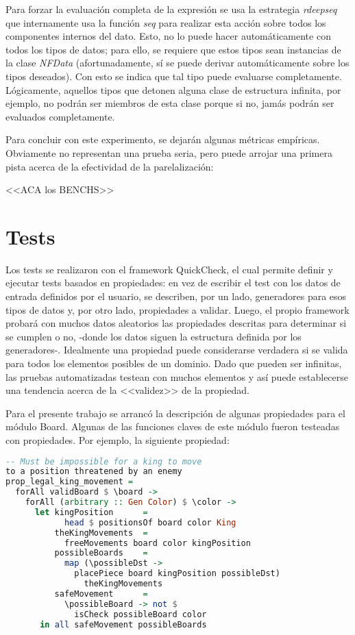 \documentclass{llncs}
\begin{document}
Para forzar la evaluación completa de la expresión se usa la estrategia \textit{rdeepseq} que internamente usa la función \textit{seq} para realizar esta acción sobre todos los componentes internos del dato. Esto, no lo puede hacer automáticamente con todos los tipos de datos; para ello, se requiere que estos tipos sean instancias de la clase \textit{NFData} (afortunadamente, sí se puede derivar automáticamente sobre los tipos deseados). Con esto se indica que tal tipo puede evaluarse completamente. Lógicamente, aquellos tipos que detonen alguna clase de estructura infinita, por ejemplo, no podrán ser miembros de esta clase porque si no, jamás podrán ser evaluados completamente.

Para concluir con este experimento, se dejarán algunas métricas empíricas. Obviamente no representan una prueba seria, pero puede arrojar una primera pista acerca de la efectividad de la parelalización:

<<ACA los BENCHS>>

\section{Tests}

Los tests se realizaron con el framework QuickCheck, el cual permite definir y ejecutar tests basados en propiedades: en vez de escribir el test con los datos de entrada definidos por el usuario, se describen, por un lado, generadores para esos tipos de datos y, por otro lado, propiedades a validar. Luego, el propio framework probará con muchos datos aleatorios las propiedades descritas para determinar si se cumplen o no, -donde los datos siguen la estructura definida por los generadores-. Idealmente una propiedad puede considerarse verdadera si se valida para todos los elementos posibles de un dominio. Dado que pueden ser infinitas, las pruebas automatizadas testean con muchos elementos y así puede establecerse una tendencia acerca de la <<validez>> de la propiedad.

Para el presente trabajo se arrancó la descripción de algunas propiedades para el módulo Board. Algunas de las funciones claves de este módulo fueron testeadas con propiedades. Por ejemplo, la siguiente propiedad:

\begin{lstlisting}[frame=single, language=haskell, captionpos=b, caption=Propiedad sobre los movimientos legales del rey]
-- Must be impossible for a king to move
to a position threatened by an enemy
prop_legal_king_movement =
  forAll validBoard $ \board ->
    forAll (arbitrary :: Gen Color) $ \color ->
      let kingPosition      =
            head $ positionsOf board color King
          theKingMovements  =
            freeMovements board color kingPosition
          possibleBoards    =
            map (\possibleDst ->
              placePiece board kingPosition possibleDst)
                theKingMovements
          safeMovement      =
            \possibleBoard -> not $
              isCheck possibleBoard color
       in all safeMovement possibleBoards
\end{lstlisting}
\end{document}
